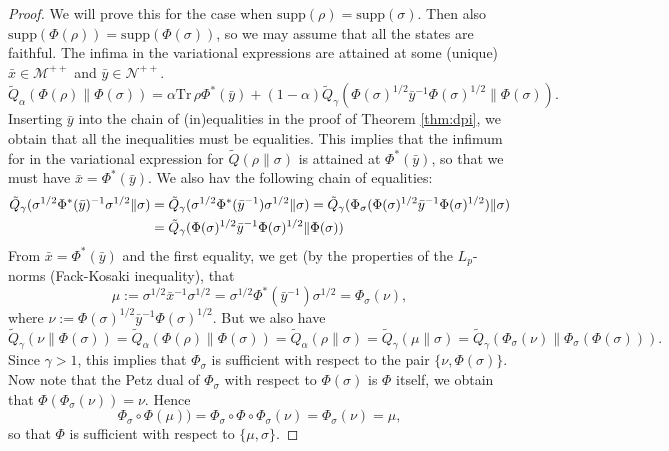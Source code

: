 \documentclass[12pt]{article}
\theoremstyle{definition}
\theoremstyle{remark}
\def\supp{\mathrm{supp}}
\def\Tr{\mathrm{Tr}\,}
\def\Me{\mathcal M}
\def\Ne{\mathcal N}
\begin{document}
\begin{proof} We will prove this for the case when $\supp(\rho)=\supp(\sigma)$. Then also
$\supp(\Phi(\rho))=\supp(\Phi(\sigma))$, so we may assume that all the states are
faithful. The infima in the variational expressions are
attained at some (unique) $\bar x\in \Me^{++}$ and  $\bar y\in \Ne^{++}$. 
\[
\tilde Q_\alpha(\Phi(\rho)\|\Phi(\sigma))=\alpha\Tr \rho\Phi^*(\bar y)+(1-\alpha)\tilde
Q_\gamma(\Phi(\sigma)^{1/2}\bar y^{-1}\Phi(\sigma)^{1/2}\|\Phi(\sigma)).
\]
Inserting $\bar y$ into the chain of (in)equalities in the proof of Theorem \ref{thm:dpi},
we obtain that all the inequalities must be equalities. This implies that the infimum for
in the variational expression for $\tilde Q(\rho\|\sigma)$ is attained at $\Phi^*(\bar
y)$, so that we must have $\bar x=\Phi^*(\bar y)$. We also hav the following chain of
equalities:
\begin{align}
\tilde
Q_\gamma(\sigma^{1/2}\Phi^*(\bar y)^{-1}\sigma^{1/2}\|\sigma)&=\tilde
Q_\gamma(\sigma^{1/2}\Phi^*(\bar y^{-1})\sigma^{1/2}\|\sigma)=\tilde
Q_\gamma(\Phi_\sigma(\Phi(\sigma)^{1/2}\bar y^{-1}\Phi(\sigma)^{1/2})\|\sigma)\notag \\&=\tilde
Q_\gamma(\Phi(\sigma)^{1/2}\bar
y^{-1}\Phi(\sigma)^{1/2}\|\Phi(\sigma))\label{eq:equalities}
\end{align}
From $\bar x=\Phi^*(\bar y)$ and the first equality, we get (by the properties of the $L_p$-norms (Fack-Kosaki
inequality), that
\[
\mu:= \sigma^{1/2}\bar x^{-1}\sigma^{1/2}=\sigma^{1/2}\Phi^*(\bar
y^{-1})\sigma^{1/2}=\Phi_\sigma(\nu),
\]
where $\nu:=\Phi(\sigma)^{1/2}\bar y^{-1}\Phi(\sigma)^{1/2}$. But we also have
\[
\tilde Q_\gamma(\nu\|\Phi(\sigma))=\tilde Q_\alpha(\Phi(\rho)\|\Phi(\sigma))=\tilde
Q_\alpha(\rho\|\sigma)=\tilde Q_\gamma(\mu\|\sigma)=\tilde
Q_\gamma(\Phi_\sigma(\nu)\|\Phi_\sigma(\Phi(\sigma))).
\]
Since $\gamma>1$, this implies that $\Phi_\sigma$ is sufficient with respect to the pair
$\{\nu,\Phi(\sigma)\}$. Now note that the Petz dual of $\Phi_\sigma$ with respect to
$\Phi(\sigma)$ is $\Phi$ itself, we obtain that $\Phi(\Phi_\sigma(\nu))=\nu$. Hence
\[
\Phi_\sigma\circ \Phi(\mu))=\Phi_\sigma\circ \Phi\circ
\Phi_\sigma(\nu)=\Phi_\sigma(\nu)=\mu,
\]
so that $\Phi$ is sufficient with respect to $\{\mu,\sigma\}$. 
\end{proof}
\end{document}
